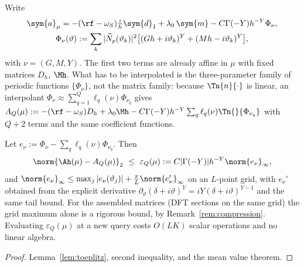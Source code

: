 Write
\begin{equation}
\begin{gathered}
 \sym{a}_\mu=-(\rf-\omega_S)\tfrac{i}{h}\sym{d}_1+\lambda_0\,\sym{m}-C\Gamma(-Y)h^{-Y}\Phi_{\nu},\\
 \Phi_\nu(\vartheta):=\sum_k|\widehat N_p(\vartheta_k)|^2\bigl[(Gh+i\vartheta_k)^Y+(Mh-i\vartheta_k)^Y\bigr],
\end{gathered}
 \label{eq:affine-split}
\end{equation}
with $\nu=(G,M,Y)$.  The first two terms are already affine in $\mu$ with
fixed matrices $D_h$, $\Mh$.  What has to be interpolated is the
three-parameter family of periodic functions $\{\Phi_\nu\}$, not the
matrix family: because $\Tn{n}{\cdot}$ is linear, an interpolant
$\Phi_\nu\approx\sum_{q=1}^Q\ell_q(\nu)\Phi_{\nu_q}$ gives
$A_Q(\mu):=-(\rf-\omega_S)D_h+\lambda_0\Mh-C\Gamma(-Y)h^{-Y}\sum_q\ell_q(\nu)\Tn{}{\Phi_{\nu_q}}$
with $Q+2$ terms and the same coefficient functions.
\begin{lemma}\label{lem:eim}
Let $e_\nu:=\Phi_\nu-\sum_q\ell_q(\nu)\Phi_{\nu_q}$.  Then
\[
 \norm{\Ah(\mu)-A_Q(\mu)}_2\ \le\ \varepsilon_Q(\mu):=C|\Gamma(-Y)|h^{-Y}\norm{e_\nu}_\infty,
\]
and $\norm{e_\nu}_\infty\le\max_{j}|e_\nu(\vartheta_j)|+\tfrac{\pi}{L}\norm{e_\nu'}_\infty$
on an $L$-point grid, with $e_\nu'$ obtained from the explicit derivative
$\partial_\vartheta(\delta+i\vartheta)^Y=iY(\delta+i\vartheta)^{Y-1}$ and the
same tail bound.  For the assembled matrices (DFT sections on the same grid) the grid maximum
alone is a rigorous bound, by Remark~\ref{rem:compression}.  Evaluating $\varepsilon_Q(\mu)$ at
a new query costs $O(LK)$ scalar operations and no linear algebra.
\end{lemma}
\begin{proof}
Lemma~\ref{lem:toeplitz}, second inequality, and the mean value theorem.
\end{proof}
